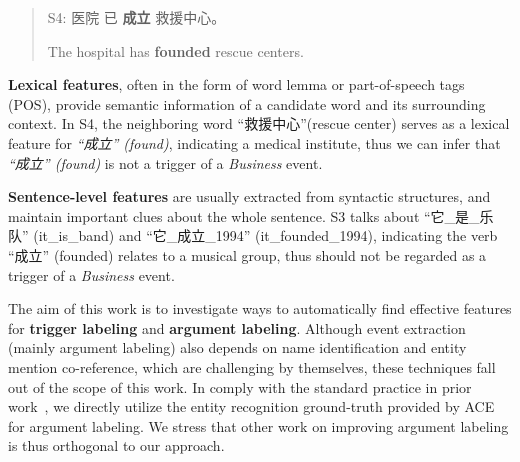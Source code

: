 \begin{quote}
S4: 医院 已 \textbf{成立} 救援中心。

\hspace{0.52cm} The hospital has \textbf{founded} rescue centers.
\end{quote}

\textbf{Lexical features}, often in the form of word lemma or part-of-speech tags (POS), provide semantic information of a candidate word and its surrounding context. In S4, the neighboring word ``救援中心''(rescue center) serves as a lexical feature for \textit{``成立'' (found)}, indicating a medical institute,  thus we can infer that \textit{``成立'' (found)} is not a trigger of a \emph{Business} event.

\textbf{Sentence-level features} are usually extracted from syntactic structures, and  maintain important clues about the whole sentence. S3 talks about ``它\_是\_乐队'' (it\_is\_band) and ``它\_成立\_1994'' (it\_founded\_1994), indicating the verb ``成立'' (founded) relates to a musical group, thus should not be regarded as a trigger of a \emph{Business} event.

The aim of this work is to investigate ways to automatically find effective features for \textbf{trigger labeling} and \textbf{argument labeling}.
Although event extraction (mainly argument labeling) also depends on name identification and entity mention co-reference, which are challenging by themselves, these techniques fall out of the scope of this work. In comply with the standard practice in prior work~\cite{chen2009language,chen2012joint}, we directly utilize the entity recognition ground-truth provided by ACE for argument labeling. We stress that other work on improving argument labeling is thus orthogonal to our approach.

